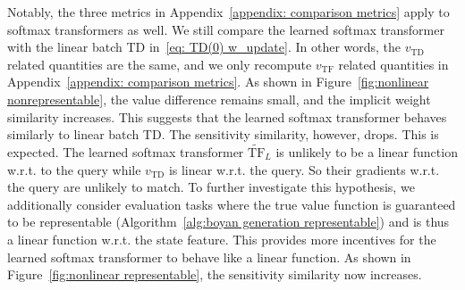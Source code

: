 \documentclass{article}
\newcommand{\tf}{\text{TF}}
\newcommand{\ntf}{\widetilde{\tf}}
\newcommand{\td}{\text{TD}}
\begin{document}
Notably, the three metrics in Appendix~\ref{appendix: comparison metrics} apply to softmax transformers as well.
We still compare the learned softmax transformer with the linear batch TD in~\eqref{eq: TD(0) w_update}.
In other words, the $v_\td$ related quantities are the same, and we only recompute $v_\tf$ related quantities in Appendix~\ref{appendix: comparison metrics}.
As shown in Figure~\ref{fig:nonlinear nonrepresentable},
the value difference remains small, and the implicit weight similarity increases.
This suggests that the learned softmax transformer behaves similarly to linear batch TD.
The sensitivity similarity, however, drops.
This is expected.
The learned softmax transformer $\ntf_L$ is unlikely to be a linear function w.r.t. to the query while $v_\td$ is linear w.r.t. the query.
So their gradients w.r.t. the query are unlikely to match.
To further investigate this hypothesis,
we additionally consider evaluation tasks where the true value function is guaranteed to be representable (Algorithm~\ref{alg:boyan generation representable}) and is thus a linear function w.r.t. the state feature.
This provides more incentives for the learned softmax transformer to behave like a linear function.
As shown in Figure~\ref{fig:nonlinear representable},
the sensitivity similarity now increases.
\end{document}

